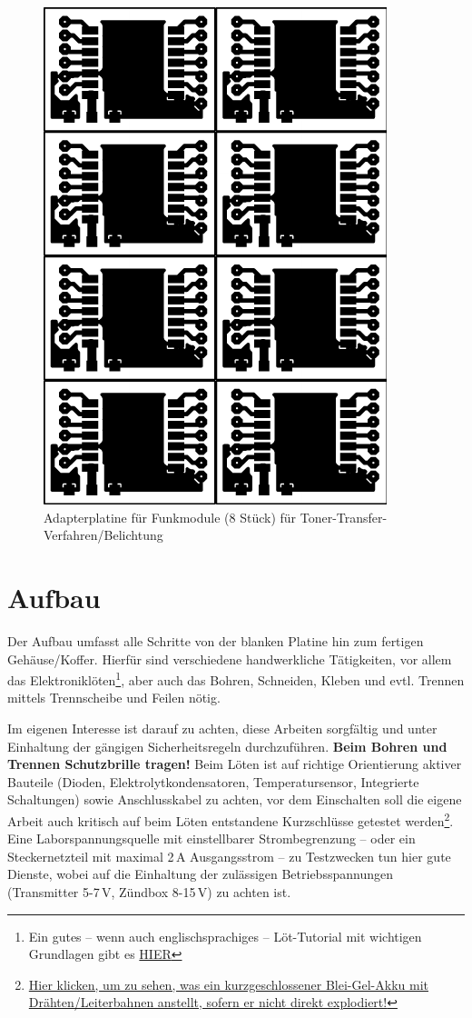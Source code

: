 \documentclass[pdftex, parskip, numbers=noenddot, toc=listof]{scrbook}
\begin{document}
		\begin{figure}
			\centering
			\includegraphics[scale=1]{Bilder/rfm-dil-70x100}
			\caption{Adapterplatine für Funkmodule (8 Stück) für Toner-Transfer-Verfahren/Belichtung}
			\label{fig:rfmprint}
		\end{figure}



	\chapter{Aufbau}

		Der Aufbau umfasst alle Schritte von der blanken Platine hin zum fertigen Gehäuse/Koffer. Hierfür sind verschiedene handwerkliche Tätigkeiten, vor allem das Elektroniklöten\footnote{Ein gutes -- wenn auch englischsprachiges -- Löt-Tutorial mit wichtigen Grundlagen gibt es \href{https://www.youtube.com/watch?v=I_NU2ruzyc4}{HIER}}, aber auch das Bohren, Schneiden, Kleben und evtl. Trennen mittels Trennscheibe und Feilen nötig.

		Im eigenen Interesse ist darauf zu achten, diese Arbeiten sorgfältig und unter Einhaltung der gängigen Sicherheitsregeln durchzuführen. \textbf{Beim Bohren und Trennen Schutzbrille tragen!} Beim Löten ist auf richtige Orientierung aktiver Bauteile (Dioden, Elektrolytkondensatoren, Temperatursensor, Integrierte Schaltungen) sowie Anschlusskabel zu achten, vor dem Einschalten soll die eigene Arbeit auch kritisch auf beim Löten entstandene Kurzschlüsse getestet werden\footnote{\href{http://www.youtube.com/watch?v=79dauuviLe4}{Hier klicken, um zu sehen, was ein kurzgeschlossener Blei-Gel-Akku mit Drähten/Leiterbahnen anstellt, sofern er nicht direkt explodiert!}}. Eine Laborspannungsquelle mit einstellbarer Strombegrenzung -- oder ein Steckernetzteil mit maximal 2\,A Ausgangsstrom -- zu Testzwecken tun hier gute Dienste, wobei auf die Einhaltung der zulässigen Betriebsspannungen (Transmitter 5-7\,V, Zündbox 8-15\,V) zu achten ist.
\end{document}
